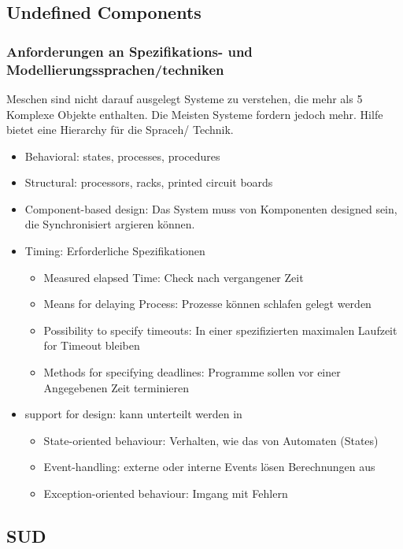 \subsection{Undefined Components}

\subsubsection{Anforderungen an Spezifikations- und Modellierungssprachen/techniken}

Meschen sind nicht darauf ausgelegt Systeme zu verstehen, die mehr als 5 Komplexe Objekte enthalten.
Die Meisten Systeme fordern jedoch mehr.
Hilfe bietet eine Hierarchy für die Spraceh/ Technik.
\begin{itemize}
    \item Behavioral: states, processes, procedures
    \item Structural: processors, racks, printed circuit boards
    \item Component-based design: Das System muss von Komponenten designed sein,
            die Synchronisiert argieren können.
    \item Timing: Erforderliche Spezifikationen \begin{itemize}
        \item Measured elapsed Time: Check nach vergangener Zeit
        \item Means for delaying Process: Prozesse können schlafen gelegt werden
        \item Possibility to specify timeouts: In einer spezifizierten maximalen Laufzeit for Timeout bleiben
        \item Methods for specifying deadlines: Programme sollen vor einer Angegebenen Zeit terminieren
    \end{itemize}
    \item support for design: kann unterteilt werden in \begin{itemize}
        \item State-oriented behaviour: Verhalten, wie das von Automaten (States)
        \item Event-handling: externe oder interne Events lösen Berechnungen aus
        \item Exception-oriented behaviour: Imgang mit Fehlern
    \end{itemize}
\end{itemize}



\subsection{SUD}


